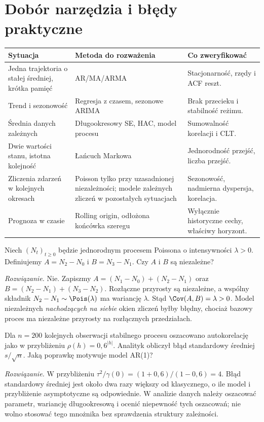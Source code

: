 \section{Dobór narzędzia i błędy praktyczne}
\begin{center}\small
\begin{tabular}{>{\raggedright\arraybackslash}p{}>{\raggedright\arraybackslash}p{}>{\raggedright\arraybackslash}p{}}
\toprule
\textbf{Sytuacja} & \textbf{Metoda do rozważenia} & \textbf{Co zweryfikować}\\
\midrule
Jedna trajektoria o stałej średniej, krótka pamięć & AR/MA/ARMA & Stacjonarność, rzędy i ACF reszt.\\
Trend i sezonowość & Regresja z czasem, sezonowe ARIMA & Brak przecieku i stabilność reżimu.\\
Średnia danych zależnych & Długookresowy SE, HAC, model procesu & Sumowalność korelacji i CLT.\\
Dwie wartości stanu, istotna kolejność & Łańcuch Markowa & Jednorodność przejść, liczba przejść.\\
Zliczenia zdarzeń w kolejnych okresach & Poisson tylko przy uzasadnionej niezależności; modele zależnych zliczeń w pozostałych sytuacjach & Sezonowość, nadmierna dyspersja, korelacja.\\
Prognoza w czasie & Rolling origin, odłożona końcówka szeregu & Wyłącznie historyczne cechy, właściwy horyzont.\\
\bottomrule
\end{tabular}
\end{center}

\begin{zadanie}
Niech $(N_t)_{t\ge0}$ będzie jednorodnym procesem
Poissona o intensywności $\lambda>0$. Definiujemy
$A=N_2-N_0$ i $B=N_3-N_1$. Czy $A$ i $B$ są niezależne?
\par\emph{Rozwiązanie.} Nie. Zapiszmy
$A=(N_1-N_0)+(N_2-N_1)$ oraz
$B=(N_2-N_1)+(N_3-N_2)$.
Rozłączne przyrosty są niezależne, a wspólny składnik
$N_2-N_1\sim\Pois(\lambda)$ ma wariancję $\lambda$.
Stąd $\Cov(A,B)=\lambda>0$.
Model niezależnych \emph{nachodzących na siebie} okien
zliczeń byłby błędny, chociaż bazowy proces ma
niezależne przyrosty na rozłącznych przedziałach.
\end{zadanie}

\begin{zadanie}
Dla $n=200$ kolejnych obserwacji stabilnego procesu
oszacowano autokorelację jako w przybliżeniu
$\rho(h)=0{,}6^{|h|}$. Analityk obliczył błąd
standardowy średniej $s/\sqrt n$. Jaką poprawkę
motywuje model AR(1)?
\par\emph{Rozwiązanie.} W przybliżeniu
$\tau^2/\gamma(0)=(1+0{,}6)/(1-0{,}6)=4$.
Błąd standardowy średniej jest około dwa razy
większy od klasycznego, o ile model i przybliżenie
asymptotyczne są odpowiednie. W analizie danych należy
oszacować parametr, wariancję długookresową i ocenić
niepewność tych oszacowań; nie wolno stosować
tego mnożnika bez sprawdzenia struktury zależności.
\end{zadanie}



